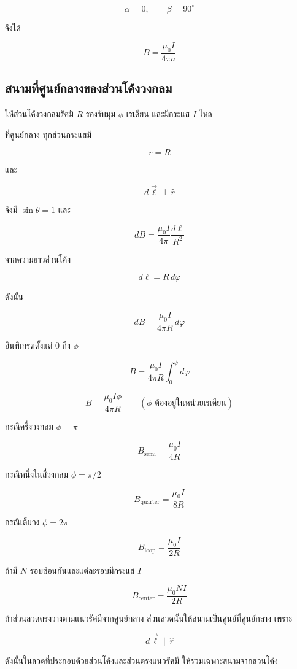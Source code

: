 \[
\alpha=0,
\qquad
\beta=90^\circ
\]

จึงได้

\begin{tcolorbox}[title={สนามจากลวดตรงกึ่งอนันต์}]
\[
\boxed{B=\frac{\mu_0 I}{4\pi a}}
\]
\end{tcolorbox}

\subsection{สนามที่ศูนย์กลางของส่วนโค้งวงกลม}

ให้ส่วนโค้งวงกลมรัศมี $R$ รองรับมุม $\phi$ เรเดียน และมีกระแส $I$ ไหล

ที่ศูนย์กลาง ทุกส่วนกระแสมี

\[
r=R
\]

และ

\[
d\vec{\ell}\perp\hat{r}
\]

จึงมี $\sin\theta=1$ และ

\[
dB
=
\frac{\mu_0 I}{4\pi}
\frac{d\ell}{R^2}
\]

จากความยาวส่วนโค้ง

\[
d\ell=R\,d\varphi
\]

ดังนั้น

\[
dB
=
\frac{\mu_0 I}{4\pi R}
\,d\varphi
\]

อินทิเกรตตั้งแต่ $0$ ถึง $\phi$

\[
B
=
\frac{\mu_0 I}{4\pi R}
\int_0^\phi d\varphi
\]

\begin{tcolorbox}[title={สนามที่ศูนย์กลางของส่วนโค้งวงกลม}]
\[
\boxed{
B
=
\frac{\mu_0 I\phi}{4\pi R}}
\qquad
(\phi\text{ ต้องอยู่ในหน่วยเรเดียน})
\]
\end{tcolorbox}

กรณีครึ่งวงกลม $\phi=\pi$

\[
\boxed{B_{\text{semi}}=\frac{\mu_0 I}{4R}}
\]

กรณีหนึ่งในสี่วงกลม $\phi=\pi/2$

\[
\boxed{B_{\text{quarter}}=\frac{\mu_0 I}{8R}}
\]

กรณีเต็มวง $\phi=2\pi$

\[
\boxed{B_{\text{loop}}=\frac{\mu_0 I}{2R}}
\]

ถ้ามี $N$ รอบซ้อนกันและแต่ละรอบมีกระแส $I$

\[
\boxed{B_{\text{center}}=\frac{\mu_0 NI}{2R}}
\]

\begin{tcolorbox}[title={ข้อควรระวังเรื่องส่วนลวดแนวรัศมี}]
ถ้าส่วนลวดตรงวางตามแนวรัศมีจากศูนย์กลาง ส่วนลวดนั้นให้สนามเป็นศูนย์ที่ศูนย์กลาง เพราะ

\[
d\vec{\ell}\parallel\hat{r}
\]

ดังนั้นในลวดที่ประกอบด้วยส่วนโค้งและส่วนตรงแนวรัศมี ให้รวมเฉพาะสนามจากส่วนโค้ง
\end{tcolorbox}

